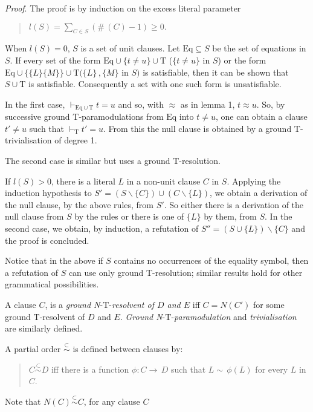 \documentclass[letterpaper]{report}
\begin{document}
\noindent
\emph{Proof}. The proof is by induction on the excess literal parameter
\begin{quote}
$\displaystyle l(S)=\sum_{C\in S}(\#\,(C)-1) \geqslant 0.$
\end{quote}

When $l(S)=0$, $S$ is a set of unit clauses. Let
$\mathrm{Eq}\subseteq S$ be the set of equations in $S$. If every set of
the form $\mathrm{Eq}\cup\{t\neq u\}\cup\mathrm{T}$ ($\{t\neq u\}$
in $S$) or the form
$\mathrm{Eq}\cup\{\{L\}\{M\}\}\cup\mathrm{T} (\{L\}\, , \{M\}$ in
$S)$ is satisfiable, then it can be shown that $S\cup\mathrm{T}$ is
satisfiable. Consequently a set with one such form is unsatisfiable.

In the first case, $\vdash_{\mathrm{Eq}\cup\mathrm{T}} t=u$ and so,
with $\approx$ as in lemma 1, $t\approx u$. So, by successive ground
$\mathrm{T}$-paramodulations from $\textrm{Eq}$ into $t\neq u$,
one can obtain a clause $t'\neq u$ such that
$\vdash_{\mathrm{T}} t'=u$. From this the null clause is
obtained by a ground $\mathrm{T}$-trivialisation of degree 1.

The second case is similar but uses a ground $\mathrm{T}$-resolution.

If $l(S)>0$, there is a literal $L$ in a non-unit clause $C$
in $S$. Applying the induction hypothesis to
$S'{=}(S\backslash\{C\})\cup(C\backslash\{L\})$, we obtain a
derivation of the null clause, by the above rules, from $S'$.
So either there is a derivation of the null clause from $S$ by the
rules or there is one of $\{L\}$ by them, from $S$. In the second
case, we obtain, by induction, a refutation of
$S''{=}(S\cup\{L\})\backslash\{C\}$ and the proof is
concluded.

Notice that in the above if $S$ contains no occurrences of the
equality symbol, then a refutation of $S$ can use only ground
$\mathrm{T}$-resolution; similar results hold for other grammatical
possibilities.

A clause $C$, is a \emph{ground N}-$\mathrm{T}$-\emph{resolvent of
	$D$ and $E$} iff $C{=}N(C')$ for some ground
$\mathrm{T}$-resolvent of $D$ and $E$. \emph{Ground
	N}-$\mathrm{T}$-\emph{paramodulation} and \emph{trivialisation} are
similarly defined.

A partial order $\stackrel{{\subset}}{{\sim}}$ is defined between clauses
by:
\begin{quote}
$C\stackrel{{\subset}}{{\sim}}D$ iff there is a function
$\phi \colon C{\rightarrow}\,D$ such that $L{\sim}\,\phi(L)$ for
every $L$ in $C$.
\end{quote}
Note that $N(C)\stackrel{{\subset}}{{\sim}}C$, for any clause $C$
\end{document}
